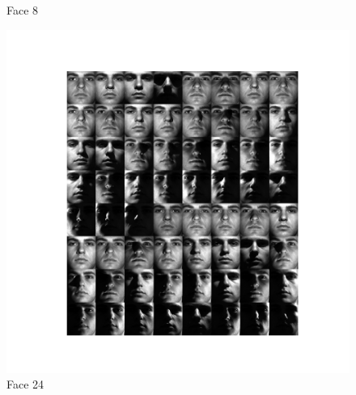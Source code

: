 \begin{enumerate}[label=\arabic*.]
\begin{mdframed}[style=MyFrame]
\begin{figure}[H]
                \caption{Face 8}
            \end{figure}
            \begin{figure}[H]
                \includegraphics[height=0.35\textheight]{../media/face-24.png}
                \caption{Face 24}
            \end{figure}
        \end{mdframed}


\end{enumerate}
